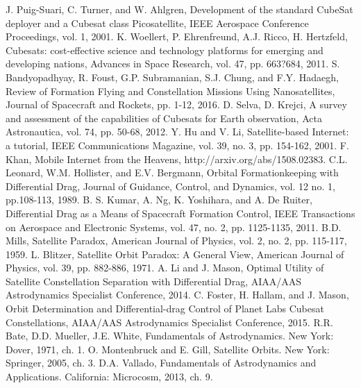 \documentclass[letterpaper, 10 pt, conference]{ieeeconf}  %
\begin{document}
\begin{thebibliography}{99}

 J. Puig-Suari, C. Turner, and W. Ahlgren, Development of the standard CubeSat deployer and a Cubesat class Picosatellite, IEEE Aerospace Conference Proceedings, vol. 1, 2001.
 K. Woellert, P. Ehrenfreund, A.J. Ricco, H. Hertzfeld, Cubesats: cost-effective science and technology platforms for emerging and developing nations, Advances in Space Research, vol. 47, pp. 663?684, 2011.
 S. Bandyopadhyay, R. Foust, G.P. Subramanian, S.J. Chung, and F.Y. Hadaegh, Review of Formation Flying and Constellation Missions Using Nanosatellites, Journal of Spacecraft and Rockets, pp. 1-12, 2016.
 D. Selva, D. Krejci, A survey and assessment of the capabilities of Cubesats for Earth observation, Acta Astronautica, vol. 74, pp. 50-68, 2012.
 Y. Hu and V. Li, Satellite-based Internet: a tutorial, IEEE Communications Magazine, vol. 39, no. 3, pp. 154-162, 2001.
 F. Khan, Mobile Internet from the Heavens, http://arxiv.org/abs/1508.02383.
 C.L. Leonard, W.M. Hollister, and E.V. Bergmann, Orbital Formationkeeping with Differential Drag, Journal of Guidance, Control, and Dynamics, vol. 12 no. 1, pp.108-113, 1989.
 B. S. Kumar, A. Ng, K. Yoshihara, and A. De Ruiter, Differential Drag as a Means of Spacecraft Formation Control, IEEE Transactions on Aerospace and Electronic Systems, vol. 47, no. 2, pp. 1125-1135, 2011.
 B.D. Mills, Satellite Paradox, American Journal of Physics, vol. 2, no. 2, pp. 115-117, 1959.
 L. Blitzer, Satellite Orbit Paradox: A General View, American Journal of Physics, vol. 39, pp. 882-886, 1971.
 A. Li and J. Mason, Optimal Utility of Satellite Constellation Separation with Differential Drag, AIAA/AAS Astrodynamics Specialist Conference, 2014.
 C. Foster, H. Hallam, and J. Mason, Orbit Determination and Differential-drag Control of Planet Labs Cubesat Constellations, AIAA/AAS  Astrodynamics Specialist Conference, 2015.
 R.R. Bate, D.D. Mueller, J.E. White, Fundamentals of Astrodynamics.   New York: Dover, 1971, ch. 1.
 O. Montenbruck and E. Gill, Satellite Orbits.   New York: Springer, 2005, ch. 3.
 D.A. Vallado, Fundamentals of Astrodynamics and Applications.   California: Microcosm, 2013, ch. 9.

\end{thebibliography}
\end{document}
